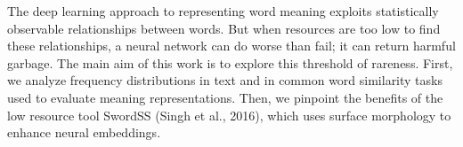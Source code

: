 The deep learning approach to representing word meaning exploits statistically observable relationships between words. But when resources are too low to find these relationships, a neural network can do worse than fail; it can return harmful garbage. The main aim of this work is to explore this threshold of rareness. First, we  analyze frequency distributions in text and in common word similarity tasks used to evaluate meaning representations. Then, we pinpoint the benefits of the low resource tool SwordSS (Singh et al., 2016), which uses surface morphology to enhance neural embeddings.

